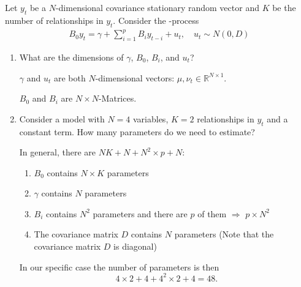 Let $y_t$ be a $N$-dimensional covariance stationary random vector and $K$ be the number of relationships in $y_t$. Consider the \varp[p]{}-process
\begin{align*}
    B_0 y_t = \gamma + \sum_{i=1}^p B_i y_{t-i} + u_t, \quad u_t \sim N(0, D)
\end{align*}

\begin{enumerate}
    \item What are the dimensions of $\gamma$, $B_0$, $B_i$, and $u_t$?

          \begin{sol}
              $\gamma$ and $u_t$ are both $N$-dimensional vectors: $\mu, \nu_t \in \mathbb{R}^{N \times 1}$.

              $B_0$ and $B_i$ are $N \times N$-Matrices.
          \end{sol}

    \item Consider a \svarp[2]{} model with $N=4$ variables, $K=2$ relationships in $y_t$ and a constant term. How many parameters do we need to estimate?

          \begin{sol}
              In general, there are $NK + N + N^2 \times p + N$:
              \begin{enumerate}[label=-]
                  \item $B_0$ contains $N \times K$ parameters

                  \item $\gamma$ contains $N$ parameters

                  \item $B_i$ contains $N^2$ parameters and there are $p$ of them $\Rightarrow$ $p \times N^2$

                  \item The covariance matrix $D$ contains $N$ parameters (Note that the covariance matrix $D$ is diagonal)
              \end{enumerate}

              In our specific case the number of parameters is then
              \[ 4 \times 2 + 4 + 4^2 \times 2 + 4 = 48. \]
          \end{sol}
\end{enumerate}
